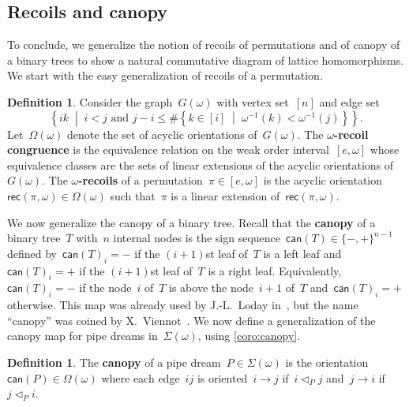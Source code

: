 \documentclass{amsart}
\theoremstyle{definition}
\newtheorem{definition}[theorem]{Definition}
\newcommand{\set}[2]{\left\{ #1 \;\middle|\; #2 \right\}} %
\newcommand{\defn}[1]{\textbf{\textsf{\color{PineGreen} #1}}} %
\newcommand{\acyclicPipeDreams}{\Sigma} %
\newcommand{\acyclicOrientations}{\Omega} %
\newcommand{\recoils}[2]{\mathsf{rec}(#1,#2)} %
\newcommand{\canopy}[1]{\mathsf{can}(#1)} %
\newcommand{\less}{\vartriangleleft} %
\newcommand{\contactLess}[1]{\less_{#1}} %
\begin{document}

\subsection{Recoils and canopy}
\label{subsec:canopy}

To conclude, we generalize the notion of recoils of permutations and of canopy of a binary trees to show a natural commutative diagram of lattice homomorphisms.
We start with the easy generalization of recoils of a permutation.

\begin{definition}
\label{def:recoils}
Consider the graph~$G(\omega)$ with vertex set~$[n]$ and edge set
\[
\set{ik}{i < j \text{ and } j-i \le \#\set{k \in [i]}{\omega^{-1}(k) < \omega^{-1}(j)}}.
\]
Let~$\acyclicOrientations(\omega)$ denote the set of acyclic orientations of~$G(\omega)$.
The \defn{$\omega$-recoil congruence} is the equivalence relation on the weak order interval~$[e, \omega]$ whose equivalence classes are the sets of linear extensions of the acyclic orientations of~$G(\omega)$.
The \defn{$\omega$-recoils} of a permutation~$\pi \in [e,\omega]$ is the acyclic orientation~${\recoils{\pi}{\omega} \in \acyclicOrientations(\omega)}$ such that~$\pi$ is a linear extension of~$\recoils{\pi}{\omega}$.
\end{definition}

We now generalize the canopy of a binary tree.
Recall that the \defn{canopy} of a binary tree~$T$ with~$n$ internal nodes is the sign sequence~${\canopy{T} \in \{{-},{+}\}^{n-1}}$ defined by~$\canopy{T}_i = {-}$ if the $(i+1)$st leaf of~$T$ is a left leaf and~$\canopy{T}_i = {+}$ if the $(i+1)$st leaf of~$T$ is a right leaf.
Equivalently, $\canopy{T}_i = -$ if the node~$i$ of~$T$ is above the node~$i+1$ of~$T$ and~$\canopy{T}_i = +$ otherwise.
This map was already used by J.-L.~Loday in~\cite{LodayRonco, Loday}, but the name ``canopy'' was coined by X.~Viennot~\cite{Viennot}.
We now define a generalization of the canopy map for pipe dreams in~$\acyclicPipeDreams(\omega)$, using \cref{coro:canopy}.

\begin{definition}
\label{def:canopy}
The \defn{canopy} of a pipe dream~$P \in \acyclicPipeDreams(\omega)$ is the orientation~$\canopy{P} \in \acyclicOrientations(\omega)$ where each edge~$ij$ is oriented~$i \to j$ if~$i \contactLess{P} j$ and~$j \to i$ if~$j \contactLess{P} i$.
\end{definition}
\end{document}
